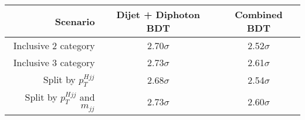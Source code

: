 \begin{tabular}{ r | c | c }
\hline
Scenario                          & Dijet + Diphoton BDT    & Combined BDT   \\
\hline
Inclusive 2 category              & 2.70$\sigma$            & 2.52$\sigma$   \\
Inclusive 3 category              & 2.73$\sigma$            & 2.61$\sigma$   \\
Split by $p_T^{Hjj}$              & 2.68$\sigma$            & 2.54$\sigma$   \\
Split by $p_T^{Hjj}$ and $m_{jj}$ & 2.73$\sigma$            & 2.60$\sigma$   \\
\hline
\end{tabular}
